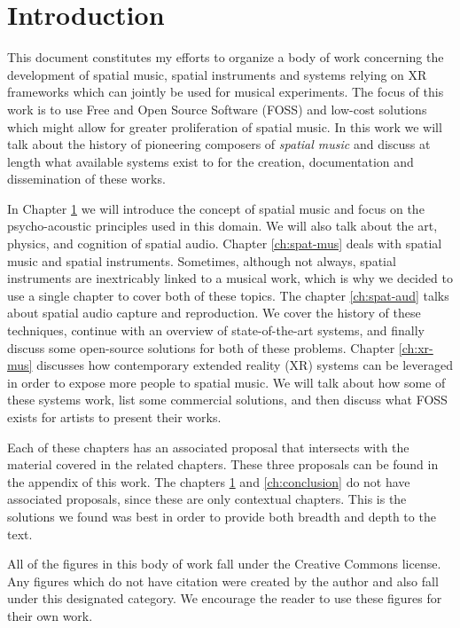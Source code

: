 \chapter{Introduction} \label{ch:intro}

This document constitutes my efforts to organize a body of work concerning the development of spatial music, spatial instruments and systems relying on XR frameworks which can jointly be used for musical experiments. The focus of this work is to use Free and Open Source Software (FOSS) and low-cost solutions which might allow for greater proliferation of spatial music. In this work we will talk about the history of pioneering composers of \textit{spatial music} and discuss at length what available systems exist to for the creation, documentation and dissemination of these works.

In Chapter \ref{ch:intro} we will introduce the concept of spatial music and focus on the psycho-acoustic principles used in this domain. We will also talk about the art, physics, and cognition of spatial audio. Chapter \ref{ch:spat-mus} deals with spatial music and spatial instruments. Sometimes, although not always, spatial instruments are inextricably linked to a musical work, which is why we decided to use a single chapter to cover both of these topics. The chapter \ref{ch:spat-aud} talks about spatial audio capture and reproduction. We cover the history of these techniques, continue with an overview of state-of-the-art systems, and finally discuss some open-source solutions for both of these problems. Chapter \ref{ch:xr-mus} discusses how contemporary extended reality (XR) systems can be leveraged in order to expose more people to spatial music. We will talk about how some of these systems work, list some commercial solutions, and then discuss what FOSS exists for artists to present their works.

Each of these chapters has an associated proposal that intersects with the material covered in the related chapters. These three proposals can be found in the appendix of this work. The chapters \ref{ch:intro} and  \ref{ch:conclusion} do not have associated proposals, since these are only contextual chapters. This is the solutions we found was best in order to provide both breadth and depth to the text.

All of the figures in this body of work fall under the Creative Commons license. Any figures which do not have citation were created by the author and also fall under this designated category. We encourage the reader to use these figures for their own work. 

